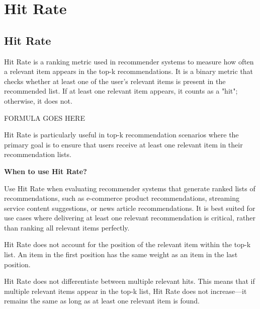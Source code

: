 
\clearpage
\thispagestyle{rankingstyle}
\section{Hit Rate}
\subsection{Hit Rate}

Hit Rate is a ranking metric used in recommender systems to measure how often a relevant item appears in the top-k
recommendations. It is a binary metric that checks whether at least one of the user's relevant items is present in the
recommended list. If at least one relevant item appears, it counts as a "hit"; otherwise, it does not.

\begin{center}
    FORMULA GOES HERE
\end{center}

Hit Rate is particularly useful in top-k recommendation scenarios where the primary goal is to ensure that users receive at
least one relevant item in their recommendation lists.

\textbf{When to use Hit Rate?}

Use Hit Rate when evaluating recommender systems that generate ranked lists of recommendations, such as e-commerce product
recommendations, streaming service content suggestions, or news article recommendations. It is best suited for use cases
where delivering at least one relevant recommendation is critical, rather than ranking all relevant items perfectly.

{
    \item Hit Rate does not account for the position of the relevant item within the top-k list. An item in the first
    position has the same weight as an item in the last position.
    \item Hit Rate does not differentiate between multiple relevant hits. This means that if multiple relevant
    items appear in the top-k list, Hit Rate does not increase—it remains the same as long as at least one relevant
    item is found. 

}

